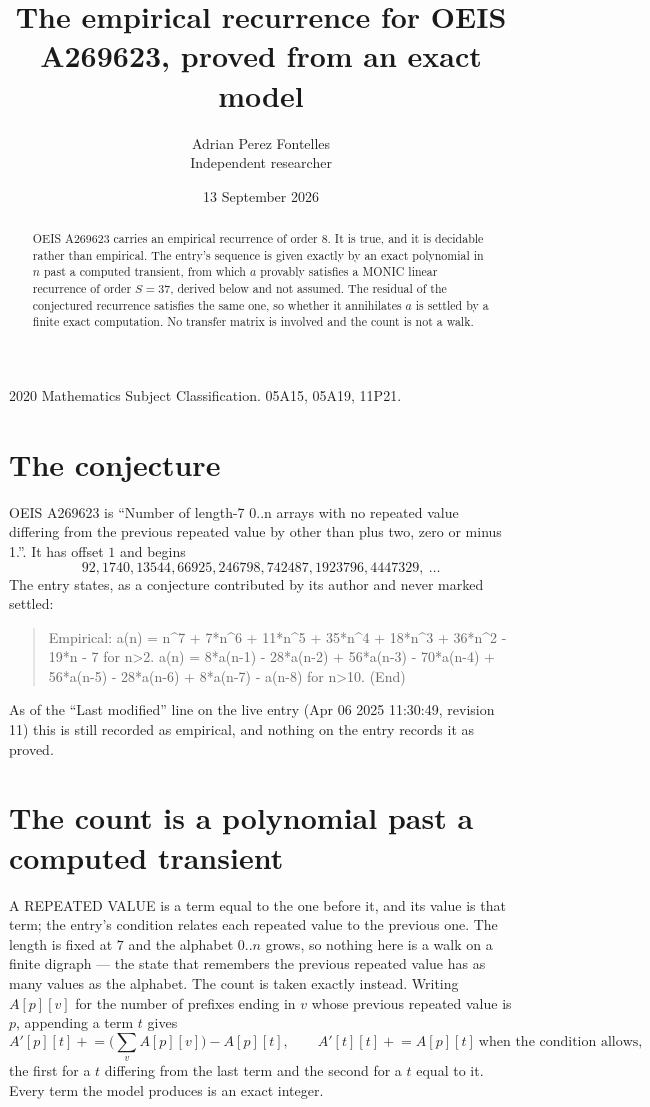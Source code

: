 \documentclass[11pt,a4paper]{article}
\title{The empirical recurrence for OEIS A269623, proved from an exact model}
\author{Adrian Perez Fontelles\\ \small Independent researcher}
\date{13 September 2026}
\theoremstyle{plain}
\theoremstyle{definition}
\begin{document}
\maketitle

\begin{abstract}
OEIS A269623 carries an empirical recurrence of order $8$. It is true, and it is
decidable rather than empirical. The entry's sequence is given exactly by an exact polynomial in $n$ past a computed transient, from
which $a$ provably satisfies a MONIC linear recurrence of order $S=37$, derived below and not
assumed. The residual of the conjectured recurrence satisfies the same one, so whether it
annihilates $a$ is settled by a finite exact computation. No transfer matrix is involved and
the count is not a walk.
\end{abstract}

\noindent\small 2020 Mathematics Subject Classification. 05A15, 05A19, 11P21.\normalsize

\section{The conjecture}

OEIS A269623 is ``Number of length-7 0..n arrays with no repeated value differing from the previous repeated value by other than plus two, zero or minus 1.''. It has offset $1$ and begins
\[
92, 1740, 13544, 66925, 246798, 742487, 1923796, 4447329,\ \dots
\]
The entry states, as a conjecture contributed by its author and never marked settled:
\begin{quote}
Empirical: a(n) = n\^{}7 + 7*n\^{}6 + 11*n\^{}5 + 35*n\^{}4 + 18*n\^{}3 + 36*n\^{}2 - 19*n - 7 for n>2. a(n) = 8*a(n-1) - 28*a(n-2) + 56*a(n-3) - 70*a(n-4) + 56*a(n-5) - 28*a(n-6) + 8*a(n-7) - a(n-8) for n>10. (End)
\end{quote}
As of the ``Last modified'' line on the live entry (Apr 06 2025 11:30:49, revision 11)
this is still recorded as empirical, and nothing on the entry records it as proved.

\section{The count is a polynomial past a computed transient}

A REPEATED VALUE is a term equal to the one before it, and its value is that term; the entry's
condition relates each repeated value to the previous one. The length is fixed at $7$ and the
alphabet $0..n$ grows, so nothing here is a walk on a finite digraph --- the state that
remembers the previous repeated value has as many values as the alphabet. The count is taken
exactly instead. Writing $A[p][v]$ for the number of prefixes ending in $v$ whose previous
repeated value is $p$, appending a term $t$ gives
\[
A'[p][t] \mathrel{+}= \Big(\sum_v A[p][v]\Big) - A[p][t],
\qquad
A'[t][t] \mathrel{+}= A[p][t]\ \text{when the condition allows},
\]
the first for a $t$ differing from the last term and the second for a $t$ equal to it. Every
term the model produces is an exact integer.
\end{document}
